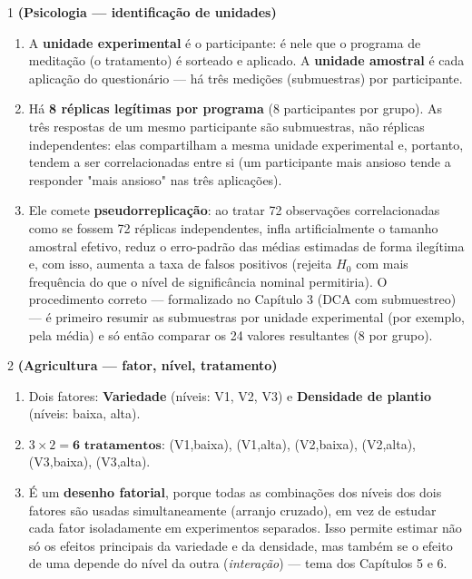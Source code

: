 \documentclass[11pt]{article}
\begin{document}

\begin{questao}{1} \textbf{(Psicologia --- identificação de unidades)}
\end{questao}
\begin{solucao}
\begin{enumerate}[label=(\alph*)]
  \item A \textbf{unidade experimental} é o participante: é nele que o programa de meditação
    (o tratamento) é sorteado e aplicado. A \textbf{unidade amostral} é cada aplicação do
    questionário — há três medições (submuestras) por participante.
  \item Há \textbf{8 réplicas legítimas por programa} (8 participantes por grupo). As três
    respostas de um mesmo participante são submuestras, não réplicas independentes: elas
    compartilham a mesma unidade experimental e, portanto, tendem a ser correlacionadas entre
    si (um participante mais ansioso tende a responder "mais ansioso" nas três aplicações).
  \item Ele comete \textbf{pseudorreplicação}: ao tratar 72 observações correlacionadas como se
    fossem 72 réplicas independentes, infla artificialmente o tamanho amostral efetivo, reduz o
    erro-padrão das médias estimadas de forma ilegítima e, com isso, aumenta a taxa de falsos
    positivos (rejeita $H_0$ com mais frequência do que o nível de significância nominal
    permitiria). O procedimento correto — formalizado no Capítulo 3 (DCA com submuestreo) — é
    primeiro resumir as submuestras por unidade experimental (por exemplo, pela média) e só então
    comparar os 24 valores resultantes (8 por grupo).
\end{enumerate}
\end{solucao}

\begin{questao}{2} \textbf{(Agricultura --- fator, nível, tratamento)}
\end{questao}
\begin{solucao}
\begin{enumerate}[label=(\alph*)]
  \item Dois fatores: \textbf{Variedade} (níveis: V1, V2, V3) e \textbf{Densidade de plantio}
    (níveis: baixa, alta).
  \item $3 \times 2 = \textbf{6 tratamentos}$: (V1,baixa), (V1,alta), (V2,baixa), (V2,alta),
    (V3,baixa), (V3,alta).
  \item É um \textbf{desenho fatorial}, porque todas as combinações dos níveis dos dois fatores
    são usadas simultaneamente (arranjo cruzado), em vez de estudar cada fator isoladamente em
    experimentos separados. Isso permite estimar não só os efeitos principais da variedade e da
    densidade, mas também se o efeito de uma depende do nível da outra (\emph{interação}) — tema
    dos Capítulos 5 e 6.
\end{enumerate}
\end{solucao}
\end{document}
